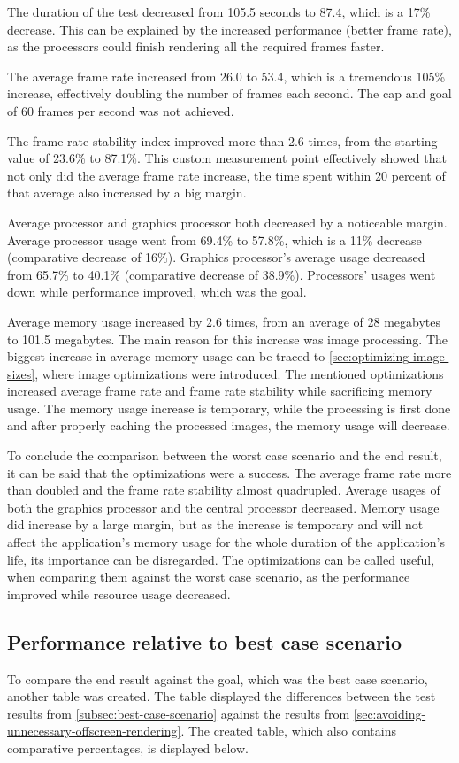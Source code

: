 \documentclass[a4paper,12pt]{article}
\begin{document}
The duration of the test decreased from 105.5 seconds to 87.4, which is a 17\% decrease. This can be explained by the increased performance (better frame rate), as the processors could finish rendering all the required frames faster.

The average frame rate increased from 26.0 to 53.4, which is a tremendous 105\% increase, effectively doubling the number of frames each second. The cap and goal of 60 frames per second was not achieved.

The frame rate stability index improved more than 2.6 times, from the starting value of 23.6\% to 87.1\%. This custom measurement point effectively showed that not only did the average frame rate increase, the time spent within 20 percent of that average also increased by a big margin.

Average processor and graphics processor both decreased by a noticeable margin. Average processor usage went from 69.4\% to 57.8\%, which is a 11\% decrease (comparative decrease of 16\%). Graphics processor's average usage decreased from 65.7\% to 40.1\% (comparative decrease of 38.9\%). Processors' usages went down while performance improved, which was the goal.

Average memory usage increased by 2.6 times, from an average of 28 megabytes to 101.5 megabytes. The main reason for this increase was image processing. The biggest increase in average memory usage can be traced to \autoref{sec:optimizing-image-sizes}, where image optimizations were introduced. The mentioned optimizations increased average frame rate and frame rate stability while sacrificing memory usage. The memory usage increase is temporary, while the processing is first done and after properly caching the processed images, the memory usage will decrease.

To conclude the comparison between the worst case scenario and the end result, it can be said that the optimizations were a success. The average frame rate more than doubled and the frame rate stability almost quadrupled. Average usages of both the graphics processor and the central processor decreased. Memory usage did increase by a large margin, but as the increase is temporary and will not affect the application's memory usage for the whole duration of the application's life, its importance can be disregarded. The optimizations can be called useful, when comparing them against the worst case scenario, as the performance improved while resource usage decreased.

\subsection{Performance relative to best case scenario}
To compare the end result against the goal, which was the best case scenario, another table was created. The table displayed the differences between the test results from \autoref{subsec:best-case-scenario} against the results from \autoref{sec:avoiding-unnecessary-offscreen-rendering}. The created table, which also contains comparative percentages, is displayed below.
\end{document}

